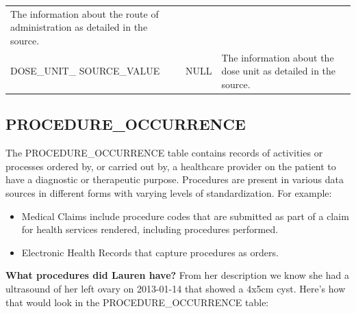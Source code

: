 \documentclass[]{book}
\providecommand{\tightlist}{%
  \setlength{\itemsep}{0pt}\setlength{\parskip}{0pt}}
\begin{document}
\begin{longtable}[]{@{}lll@{}}
\begin{minipage}[t]{0.47\columnwidth}
The information about the route of administration as detailed in the
source.\strut
\end{minipage}\tabularnewline
\begin{minipage}[t]{0.30\columnwidth}\raggedright\strut
DOSE\_UNIT\_ SOURCE\_VALUE\strut
\end{minipage} & \begin{minipage}[t]{0.14\columnwidth}\raggedright\strut
NULL\strut
\end{minipage} & \begin{minipage}[t]{0.47\columnwidth}\raggedright\strut
The information about the dose unit as detailed in the source.\strut
\end{minipage}\tabularnewline
\bottomrule
\end{longtable}

\subsection{PROCEDURE\_OCCURRENCE}\label{procedureOccurrence}

The PROCEDURE\_OCCURRENCE table contains records of activities or
processes ordered by, or carried out by, a healthcare provider on the
patient to have a diagnostic or therapeutic purpose. Procedures are
present in various data sources in different forms with varying levels
of standardization. For example:

\begin{itemize}
\tightlist
\item
  Medical Claims include procedure codes that are submitted as part of a
  claim for health services rendered, including procedures performed.
\item
  Electronic Health Records that capture procedures as orders.
\end{itemize}

\textbf{What procedures did Lauren have?} From her description we know
she had a ultrasound of her left ovary on 2013-01-14 that showed a 4x5cm
cyst. Here's how that would look in the PROCEDURE\_OCCURRENCE table:
\end{document}
